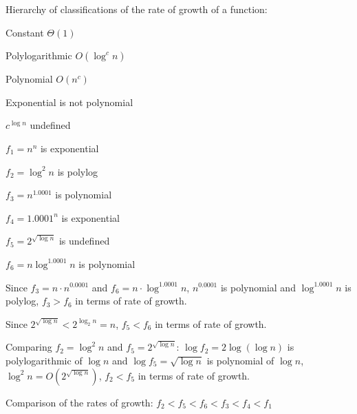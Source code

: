 Hierarchy of classifications of the rate of growth of a function:

Constant $\Theta(1)$

Polylogarithmic $O(\log^c n)$

Polynomial $O(n^c)$

Exponential is not polynomial

$c^{\log n}$ undefined

\begin{ex}
$f_1 = n^n$ is exponential

$f_2 = \log^2 n$ is polylog

$f_3 = n^{1.0001}$ is polynomial

$f_4 = 1.0001^n$ is exponential

$f_5 = 2^{\sqrt{\log n}}$ is undefined

$f_6 = n \log^{1.0001} n$ is polynomial

Since $f_3 = n \cdot n^{0.0001}$ and $f_6 = n \cdot \log^{1.0001} n$, $ n^{0.0001}$ is polynomial and $\log^{1.0001} n$ is polylog, $f_3 > f_6$ in terms of rate of growth.

Since $2^{\sqrt{\log n}} < 2^{\log_2 n} = n$, $f_5 < f_6$ in terms of rate of growth.

Comparing $f_2 = \log^2 n$ and $f_5 = 2^{\sqrt{\log n}}$: $\log f_2 = 2 \log(\log n)$ is polylogarithmic of $\log n$ and $\log f_5 = \sqrt{\log n}$ is polynomial of $\log n$, $\log^2 n = O (2^{\sqrt{\log n}})$, $f_2 < f_5$ in terms of rate of growth.

Comparison of the rates of growth: $f_2 < f_5 < f_6 < f_3 < f_4 < f_1$
\end{ex}

